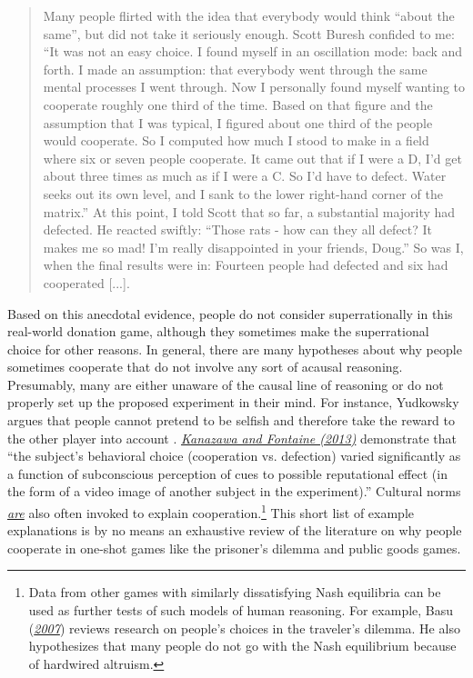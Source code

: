 \begin{quote}
Many people flirted with the idea that everybody would think ``about the
same'', but did not take it seriously enough. Scott Buresh confided to
me: ``It was not an easy choice. I found myself in an oscillation mode:
back and forth. I made an assumption: that everybody went through the
same mental processes I went through. Now I personally found myself
wanting to cooperate roughly one third of the time. Based on that figure
and the assumption that I was typical, I figured about one third of the
people would cooperate. So I computed how much I stood to make in a
field where six or seven people cooperate. It came out that if I were a
D, I'd get about three times as much as if I were a C. So I'd have to
defect. Water seeks out its own level, and I sank to the lower
right-hand corner of the matrix.'' At this point, I told Scott that so
far, a substantial majority had defected. He reacted swiftly: ``Those
rats - how can they all defect? It makes me so mad! I'm really
disappointed in your friends, Doug.'' So was I, when the final results
were in: Fourteen people had defected and six had cooperated {[}...{]}.
\end{quote}

Based on this anecdotal evidence, people do not consider superrationally
in this real-world donation game, although they sometimes make the
superrational choice for other reasons. In general, there are many
hypotheses about why people sometimes cooperate that do not involve any
sort of acausal reasoning. Presumably, many are either unaware of the
causal line of reasoning or do not properly set up the proposed
experiment in their mind. For instance, Yudkowsky
argues that people cannot
pretend to be selfish and therefore take the reward to the other player
into account \parencite{Yudkowsky2015-tz}.
\href{http://personal.lse.ac.uk/kanazawa/pdfs/JNPE2013.pdf}{\emph{Kanazawa
and Fontaine (2013)}} demonstrate that ``the subject's behavioral choice
(cooperation vs. defection) varied significantly as a function of
subconscious perception of cues to possible reputational effect (in the
form of a video image of another subject in the experiment).'' Cultural
norms
\href{https://en.wikipedia.org/wiki/Public_goods_game\#Applications_to_sociology}{\emph{are}}
also often invoked to explain cooperation.\footnote{Data from other
  games with similarly dissatisfying Nash equilibria can be used as
  further tests of such models of human reasoning. For example, Basu
  (\href{http://www.cs.virginia.edu/~robins/The_Travelers_Dilemma.pdf}{\emph{2007}})
  reviews research on people's choices in the traveler's dilemma. He
  also hypothesizes that many people do not go with the Nash equilibrium
  because of hardwired altruism.} This short list of example
explanations is by no means an exhaustive review of the literature on
why people cooperate in one-shot games like the prisoner's dilemma and
public goods games.

